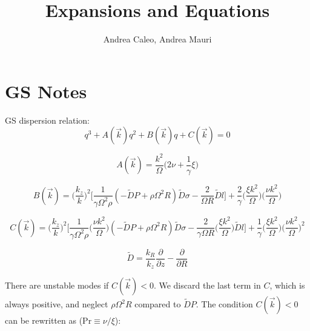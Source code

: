 \documentclass[12pt]{article}
\title{Expansions and Equations}
\date{}
\author{Andrea Caleo, Andrea Mauri}
\begin{document}
\section{GS Notes}
GS dispersion relation:
\begin{equation}
q^3 + A(\vec k) q^2 + B(\vec k) q + C(\vec k) = 0
\end{equation}

\begin{equation}
A(\vec k) = \frac{k^2}{\Omega} \Big( 2\nu +  \frac{1}{\gamma} \xi \Big)
\end{equation}

\begin{equation}
B(\vec k) = \Big( \frac{k_z}{k} \Big)^2 \Big[ \frac{1}{\gamma \Omega^2 \rho} (- \tilde D P + \rho \Omega^2 R) \tilde D \sigma -  \frac{2}{\Omega R} \tilde D l \Big] + \frac{2}{\gamma} \Big( \frac{\xi  k^2}{\Omega} \Big)  \Big( \frac{\nu k^2}{\Omega} \Big)
\end{equation}


\begin{equation}
C(\vec k) = \Big( \frac{k_z}{k} \Big)^2 \Big[ \frac{1}{\gamma \Omega^2 \rho} \Big( \frac{\nu k^2}{\Omega} \Big) (- \tilde D P + \rho \Omega^2 R) \tilde D \sigma - \frac{2}{\gamma \Omega R} \Big( \frac{\xi  k^2}{\Omega} \Big)  \tilde D l  \Big] + \frac{1}{\gamma} \Big( \frac{\xi  k^2}{\Omega} \Big) \Big(\frac{\nu k^2}{\Omega} \Big)^2
\end{equation}

\begin{equation}
\tilde D = \frac{k_R}{k_z} \frac{\partial}{\partial z} - \frac{\partial}{\partial R}
\end{equation}

There are unstable modes if $C(\vec k) < 0$. We discard the last term in $C$, which is always positive, and neglect $\rho \Omega^2 R$ compared to $\tilde D P$. The condition $C(\vec k) < 0$ can be rewritten as ($\text{Pr} \equiv  \nu / \xi$):
\end{document}
